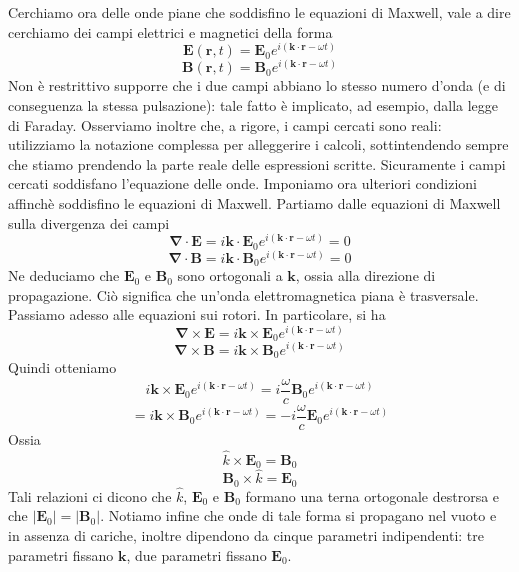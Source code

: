 \documentclass[a4paper,11pt]{book}
\let\oldnabla\nabla
\renewcommand{\nabla}{\vec{\oldnabla}}
\renewcommand{\vec}[1]{\mathbf{#1}}
\theoremstyle{theorem}
\theoremstyle{definition}
\begin{document}
Cerchiamo ora delle onde piane che soddisfino le equazioni di Maxwell, vale a dire cerchiamo dei campi elettrici e magnetici della forma
\[\vec{E}(\vec{r},t)=\vec{E}_0e^{i(\vec{k}\cdot\vec{r}-\omega t)}\]
\[\vec{B}(\vec{r},t)=\vec{B}_0e^{i(\vec{k}\cdot\vec{r}-\omega t)}\]
Non è restrittivo supporre che i due campi abbiano lo stesso numero d'onda (e di conseguenza la stessa pulsazione): tale fatto è implicato, ad esempio, dalla legge di Faraday.
Osserviamo inoltre che, a rigore, i campi cercati sono reali: utilizziamo la notazione complessa per alleggerire i calcoli, sottintendendo sempre che stiamo prendendo la parte reale delle espressioni scritte. Sicuramente i campi cercati soddisfano l'equazione delle onde. Imponiamo ora ulteriori condizioni affinchè soddisfino le equazioni di Maxwell. Partiamo dalle equazioni di Maxwell sulla divergenza dei campi
\[\nabla\cdot\vec{E}=i\vec{k}\cdot\vec{E}_0e^{i(\vec{k}\cdot\vec{r}-\omega t)}=0\]
\[\nabla\cdot\vec{B}=i\vec{k}\cdot\vec{B}_0e^{i(\vec{k}\cdot\vec{r}-\omega t)}=0\]
Ne deduciamo che $\vec{E}_0$ e $\vec{B}_0$ sono ortogonali a $\vec{k}$, ossia alla direzione di propagazione. Ciò significa che un'onda elettromagnetica piana è trasversale. Passiamo adesso alle equazioni sui rotori. In particolare, si ha
\[\nabla\times\vec{E}=i\vec{k}\times\vec{E}_0e^{i(\vec{k}\cdot\vec{r}-\omega t)}\]
\[\nabla\times\vec{B}=i\vec{k}\times\vec{B}_0e^{i(\vec{k}\cdot\vec{r}-\omega t)}\]
Quindi otteniamo
\[i\vec{k}\times\vec{E}_0e^{i(\vec{k}\cdot\vec{r}-\omega t)}=i\frac{\omega}{c}\vec{B}_0e^{i(\vec{k}\cdot\vec{r}-\omega t)}\]
\[=i\vec{k}\times\vec{B}_0e^{i(\vec{k}\cdot\vec{r}-\omega t)}=-i\frac{\omega}{c}\vec{E}_0e^{i(\vec{k}\cdot\vec{r}-\omega t)}\]
Ossia
\[\hat{k}\times\vec{E}_0=\vec{B}_0\]
\[\vec{B}_0\times\hat{k}=\vec{E}_0\]
Tali relazioni ci dicono che $\hat{k}$, $\vec{E}_0$ e $\vec{B}_0$ formano una terna ortogonale destrorsa e che $|\vec{E}_0|=|\vec{B}_0|$.
Notiamo infine che onde di tale forma si propagano nel vuoto e in assenza di cariche, inoltre dipendono da cinque parametri indipendenti: tre parametri fissano $\vec{k}$, due parametri fissano $\vec{E}_0$.
\end{document}
